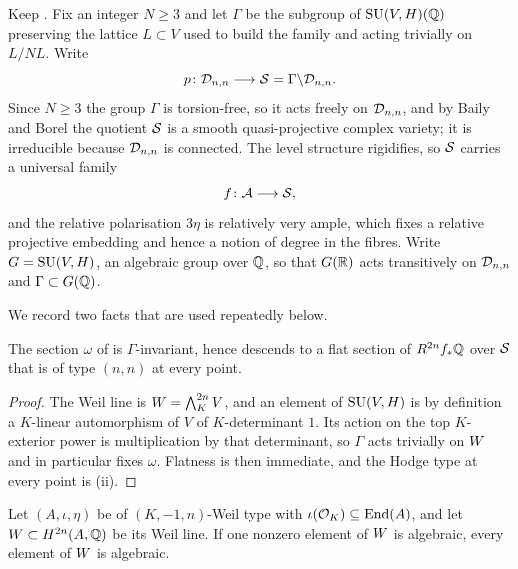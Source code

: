 \begin{setupenv}\label{setup:shimura}
Keep . Fix an integer $N\ge3$ and let $\Gamma$ be the
subgroup of $\operatorname{SU}(V,H)(\mathbb{Q})$ preserving the lattice $L\subset V$ used to build
the family and acting trivially on $L/NL$. Write
\[
  p\colon\mathcal{D}_{n,n}\longrightarrow\mathcal{S}=\Gamma\backslash\mathcal{D}_{n,n} .
\]
Since $N\ge3$ the group $\Gamma$ is torsion-free, so it acts freely on
$\mathcal{D}_{n,n}$, and by Baily and Borel \cite{BB66} the quotient $\mathcal{S}$ is a smooth
quasi-projective complex variety; it is irreducible because $\mathcal{D}_{n,n}$ is
connected. The level structure rigidifies, so $\mathcal{S}$ carries a universal family
\[
  f\colon\mathcal{A}\longrightarrow\mathcal{S},
\]
and the relative polarisation $3\eta$ is relatively very ample, which fixes a
relative projective embedding and hence a notion of degree in the fibres.
Write $G=\operatorname{SU}(V,H)$, an algebraic group over $\mathbb{Q}$, so that
$G(\mathbb{R})$ acts transitively on $\mathcal{D}_{n,n}$ and $\Gamma\subset G(\mathbb{Q})$.
\end{setupenv}

We record two facts that are used repeatedly below.

\begin{lemma}\label{lem:omegadescends}
The section $\omega$ of  is $\Gamma$-invariant, hence
descends to a flat section of $R^{2n}f_{*}\mathbb{Q}$ over $\mathcal{S}$ that is of type
$(n,n)$ at every point.
\end{lemma}

\begin{proof}
The Weil line is $W=\bigwedge^{2n}_{K}V$, and an element of $\operatorname{SU}(V,H)$ is by
definition a $K$-linear automorphism of $V$ of $K$-determinant $1$. Its action
on the top $K$-exterior power is multiplication by that determinant, so
$\Gamma$ acts trivially on $W$ and in particular fixes $\omega$. Flatness is
then immediate, and the Hodge type at every point is
(ii).
\end{proof}

\begin{lemma}\label{lem:onecomponent}
Let $(A,\iota,\eta)$ be of $(K,-1,n)$-Weil type with
$\iota(\mathcal{O}_{K})\subseteq\operatorname{End}(A)$, and let $W\subset H^{2n}(A,\mathbb{Q})$ be its
Weil line. If one nonzero element of $W$ is algebraic, every element of
$W$ is algebraic.
\end{lemma}

